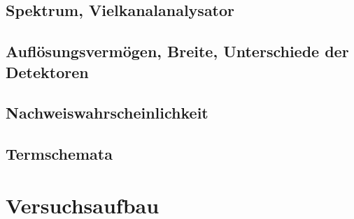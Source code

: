 \documentclass[11pt, a4paper]{article}
\numberwithin{equation}{section}
\begin{document}
\subsection{Spektrum, Vielkanalanalysator}

\subsection{Auflösungsvermögen, Breite, Unterschiede der Detektoren}

\subsection{Nachweiswahrscheinlichkeit}

\subsection{Termschemata}


\section{Versuchsaufbau}
\end{document}
